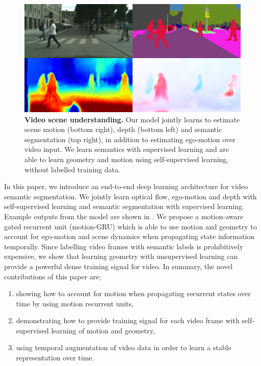 \begin{figure}[t]
\begin{center}
\includegraphics[width=0.7\columnwidth,trim={7mm 12mm 7mm 5mm},clip]{videosegnet.png}
\end{center}
   \vspace{-5mm}
   \caption[Video scene understanding.]{\textbf{Video scene understanding.} Our model jointly learns to estimate scene motion (bottom right), depth (bottom left) and semantic segmentation (top right), in addition to estimating ego-motion over video input. We learn semantics with supervised learning and are able to learn geometry and motion using self-supervised learning, without labelled training data.} %
\label{fig:video_teaser}
   \vspace{-5mm}
\end{figure}

In this paper, we introduce an end-to-end deep learning architecture for video semantic segmentation. We jointly learn optical flow, ego-motion and depth with self-supervised learning and semantic segmentation with supervised learning. Example outputs from the model are shown in . We propose a motion-aware gated recurrent unit (motion-GRU) which is able to use motion and geometry to account for ego-motion and scene dynamics when propagating state information temporally. Since labelling video frames with semantic labels is prohibitively expensive, we show that learning geometry with unsupervised learning can provide a powerful dense training signal for video. In summary, the novel contributions of this paper are;
\begin{enumerate}%
\item showing how to account for motion when propagating recurrent states over time by using motion recurrent units,
\item demonstrating how to provide training signal for each video frame with self-supervised learning of motion and geometry,
\item using temporal augmentation of video data in order to learn a stable representation over time.
\end{enumerate}

